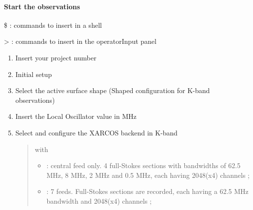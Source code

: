 \documentclass[letterpaper,10pt,english]{sphinxmanual}
\begin{document}
\paragraph{Start the observations}
\label{SpectralLine/K-band/Xarcos/start-obs:start-the-observations}\label{SpectralLine/K-band/Xarcos/start-obs::doc}
\$ : commands to insert in a shell

\textgreater{} : commands to insert in the operatorInput panel
\begin{enumerate}
\item {} 
Insert your project number
\begin{quote}

\end{quote}

\item {} 
Initial setup
\begin{quote}


\end{quote}

\item {} 
Select the active surface shape (Shaped configuration for K-band observations)
\begin{quote}

\end{quote}

\item {} 
Insert the Local Oscillator value in MHz
\begin{quote}

\end{quote}

\item {} 
Select and configure the XARCOS backend in K-band
\begin{quote}



with
\begin{itemize}
\item {} 
 : central feed only.
4 full-Stokes sections with bandwidths of 62.5 MHz, 8 MHz, 2 MHz
and 0.5 MHz, each having 2048(x4) channels ;

\item {} 
 : 7 feeds.
Full-Stokes sections are recorded, each having a 62.5 MHz
bandwidth and 2048(x4) channels ;


\end{itemize}
\end{quote}
\end{enumerate}
\end{document}
